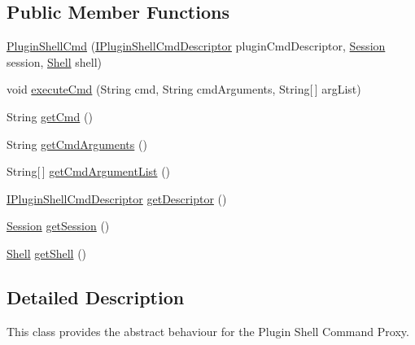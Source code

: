 \subsection*{Public Member Functions}
\begin{DoxyCompactItemize}
\item 
\hyperlink{classorg_1_1tzi_1_1use_1_1runtime_1_1shell_1_1impl_1_1_plugin_shell_cmd_a22ae7b9eccce6b383ed00350ef6c17df}{Plugin\-Shell\-Cmd} (\hyperlink{interfaceorg_1_1tzi_1_1use_1_1runtime_1_1shell_1_1_i_plugin_shell_cmd_descriptor}{I\-Plugin\-Shell\-Cmd\-Descriptor} plugin\-Cmd\-Descriptor, \hyperlink{classorg_1_1tzi_1_1use_1_1main_1_1_session}{Session} session, \hyperlink{classorg_1_1tzi_1_1use_1_1main_1_1shell_1_1_shell}{Shell} shell)
\item 
void \hyperlink{classorg_1_1tzi_1_1use_1_1runtime_1_1shell_1_1impl_1_1_plugin_shell_cmd_ae1c634c5c6e8e261a5dcf2fd7351f868}{execute\-Cmd} (String cmd, String cmd\-Arguments, String\mbox{[}$\,$\mbox{]} arg\-List)
\item 
String \hyperlink{classorg_1_1tzi_1_1use_1_1runtime_1_1shell_1_1impl_1_1_plugin_shell_cmd_a50d6ebc70eec64544e7dbe6b2683fcb1}{get\-Cmd} ()
\item 
String \hyperlink{classorg_1_1tzi_1_1use_1_1runtime_1_1shell_1_1impl_1_1_plugin_shell_cmd_a9841acba9950695df295d1be1b222948}{get\-Cmd\-Arguments} ()
\item 
String\mbox{[}$\,$\mbox{]} \hyperlink{classorg_1_1tzi_1_1use_1_1runtime_1_1shell_1_1impl_1_1_plugin_shell_cmd_a8b537c8644bccbe06575c9dfb05e39a9}{get\-Cmd\-Argument\-List} ()
\item 
\hyperlink{interfaceorg_1_1tzi_1_1use_1_1runtime_1_1shell_1_1_i_plugin_shell_cmd_descriptor}{I\-Plugin\-Shell\-Cmd\-Descriptor} \hyperlink{classorg_1_1tzi_1_1use_1_1runtime_1_1shell_1_1impl_1_1_plugin_shell_cmd_a104bf77a38e6ad8d46b718173a93096d}{get\-Descriptor} ()
\item 
\hyperlink{classorg_1_1tzi_1_1use_1_1main_1_1_session}{Session} \hyperlink{classorg_1_1tzi_1_1use_1_1runtime_1_1shell_1_1impl_1_1_plugin_shell_cmd_a25e8eb450601753ed1f95b0ae3fc63b7}{get\-Session} ()
\item 
\hyperlink{classorg_1_1tzi_1_1use_1_1main_1_1shell_1_1_shell}{Shell} \hyperlink{classorg_1_1tzi_1_1use_1_1runtime_1_1shell_1_1impl_1_1_plugin_shell_cmd_a0341785e8bc05b61fa2f3522c008f084}{get\-Shell} ()
\end{DoxyCompactItemize}


\subsection{Detailed Description}
This class provides the abstract behaviour for the Plugin Shell Command Proxy.

